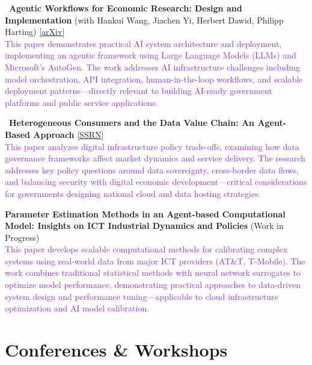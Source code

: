 \documentclass[a4paper,12pt]{article}
\begin{document}
\textbullet\ \textbf{Agentic Workflows for Economic Research: Design and Implementation} (with Hankui Wang, Jiachen Yi, Herbert Dawid, Philipp Harting) [\href{https://arxiv.org/abs/2504.09736}{arXiv}]\\ [1.5ex]
\textcolor{BlueViolet}{This paper demonstrates practical AI system architecture and deployment, implementing an agentic framework using Large Language Models (LLMs) and Microsoft's AutoGen. The work addresses AI infrastructure challenges including model orchestration, API integration, human-in-the-loop workflows, and scalable deployment patterns—directly relevant to building AI-ready government platforms and public service applications.}

\textbullet\ \textbf{Heterogeneous Consumers and the Data Value Chain: An Agent-Based Approach} [\href{https://papers.ssrn.com/sol3/papers.cfm?abstract_id=5235196}{SSRN}]\\ [1.5ex]
\textcolor{BlueViolet}{This paper analyzes digital infrastructure policy trade-offs, examining how data governance frameworks affect market dynamics and service delivery. The research addresses key policy questions around data sovereignty, cross-border data flows, and balancing security with digital economic development—critical considerations for governments designing national cloud and data hosting strategies.}

\textbullet \;\textbf{Parameter Estimation Methods in an Agent-based Computational Model: Insights on ICT Industrial Dynamics and Policies} (Work in Progress)\\ [1.5ex]
\textcolor{BlueViolet}{This paper develops scalable computational methods for calibrating complex systems using real-world data from major ICT providers (AT\&T, T-Mobile). The work combines traditional statistical methods with neural network surrogates to optimize model performance, demonstrating practical approaches to data-driven system design and performance tuning—applicable to cloud infrastructure optimization and AI model calibration.}

\section{Conferences \& Workshops}

\end{document}

